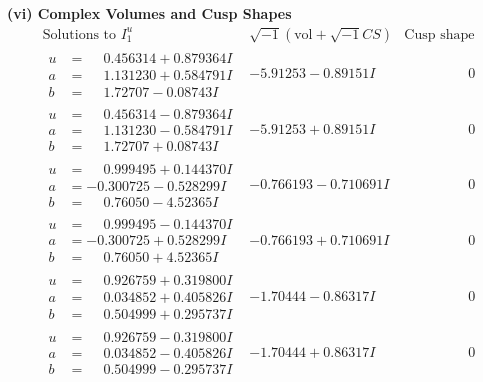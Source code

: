 \documentclass[1p]{elsarticle_modified}
\theoremstyle{definition}
\newcommand{\I}{\sqrt{-1}}
\begin{document}
\newpage\flushleft \textbf{(vi) Complex Volumes and Cusp Shapes}
$$\begin{array}{c|c|c}  
\text{Solutions to }I^u_{1}& \I (\text{vol} + \sqrt{-1}CS) & \text{Cusp shape}\\
 \hline 
\begin{aligned}
u &= \phantom{-}0.456314 + 0.879364 I \\
a &= \phantom{-}1.131230 + 0.584791 I \\
b &= \phantom{-}1.72707 - 0.08743 I\end{aligned}
 & -5.91253 - 0.89151 I & \phantom{-0.000000 } 0 \\ \hline\begin{aligned}
u &= \phantom{-}0.456314 - 0.879364 I \\
a &= \phantom{-}1.131230 - 0.584791 I \\
b &= \phantom{-}1.72707 + 0.08743 I\end{aligned}
 & -5.91253 + 0.89151 I & \phantom{-0.000000 } 0 \\ \hline\begin{aligned}
u &= \phantom{-}0.999495 + 0.144370 I \\
a &= -0.300725 - 0.528299 I \\
b &= \phantom{-}0.76050 - 4.52365 I\end{aligned}
 & -0.766193 - 0.710691 I & \phantom{-0.000000 } 0 \\ \hline\begin{aligned}
u &= \phantom{-}0.999495 - 0.144370 I \\
a &= -0.300725 + 0.528299 I \\
b &= \phantom{-}0.76050 + 4.52365 I\end{aligned}
 & -0.766193 + 0.710691 I & \phantom{-0.000000 } 0 \\ \hline\begin{aligned}
u &= \phantom{-}0.926759 + 0.319800 I \\
a &= \phantom{-}0.034852 + 0.405826 I \\
b &= \phantom{-}0.504999 + 0.295737 I\end{aligned}
 & -1.70444 - 0.86317 I & \phantom{-0.000000 } 0 \\ \hline\begin{aligned}
u &= \phantom{-}0.926759 - 0.319800 I \\
a &= \phantom{-}0.034852 - 0.405826 I \\
b &= \phantom{-}0.504999 - 0.295737 I\end{aligned}
 & -1.70444 + 0.86317 I & \phantom{-0.000000 } 0 \\ \hline\begin{aligned}

\end{aligned}
\end{array}$$
\end{document}
